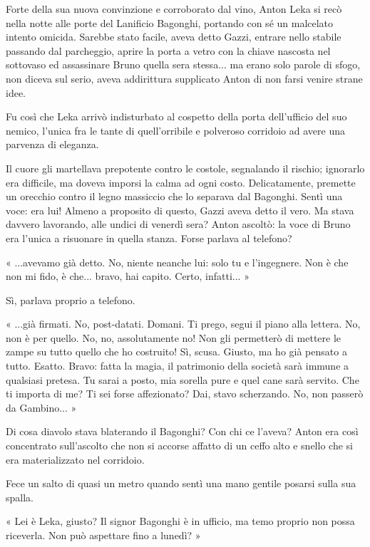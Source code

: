 Forte della sua nuova convinzione e corroborato dal vino, Anton Leka si recò nella notte alle porte del Lanificio Bagonghi, portando con sé un malcelato intento omicida. Sarebbe stato facile, aveva detto Gazzi, entrare nello stabile passando dal parcheggio, aprire la porta a vetro con la chiave nascosta nel sottovaso ed assassinare Bruno quella sera stessa... ma erano solo parole di sfogo, non diceva sul serio, aveva addirittura supplicato Anton di non farsi venire strane idee.

Fu così che Leka arrivò indisturbato al cospetto della porta dell'ufficio del suo nemico, l'unica fra le tante di quell'orribile e polveroso corridoio ad avere una parvenza di eleganza.

Il cuore gli martellava prepotente contro le costole, segnalando il rischio; ignorarlo era difficile, ma doveva imporsi la calma ad ogni costo. Delicatamente, premette un orecchio contro il legno massiccio che lo separava dal Bagonghi. Sentì una voce: era lui! Almeno a proposito di questo, Gazzi aveva detto il vero. Ma stava davvero lavorando, alle undici di venerdì sera? Anton ascoltò: la voce di Bruno era l'unica a risuonare in quella stanza. Forse parlava al telefono?

« ...avevamo già detto. No, niente neanche lui: solo tu e l'ingegnere. Non è che non mi fido, è che... bravo, hai capito. Certo, infatti... »

Sì, parlava proprio a telefono.

« ...già firmati. No, post-datati. Domani. Ti prego, segui il piano alla lettera. No, non è per quello. No, no, assolutamente no! Non gli permetterò di mettere le zampe su tutto quello che ho costruito! Sì, scusa. Giusto, ma ho già pensato a tutto. Esatto. Bravo: fatta la magia, il patrimonio della società sarà immune a qualsiasi pretesa. Tu sarai a posto, mia sorella pure e quel cane sarà servito. Che ti importa di me? Ti sei forse affezionato? Dai, stavo scherzando. No, non passerò da Gambino... »

Di cosa diavolo stava blaterando il Bagonghi? Con chi ce l'aveva? Anton era così concentrato sull'ascolto che non si accorse affatto di un ceffo alto e snello che si era materializzato nel corridoio.

Fece un salto di quasi un metro quando sentì una mano gentile posarsi sulla sua spalla.

« Lei è Leka, giusto? Il signor Bagonghi è in ufficio, ma temo proprio non possa riceverla. Non può aspettare fino a lunedì? »

